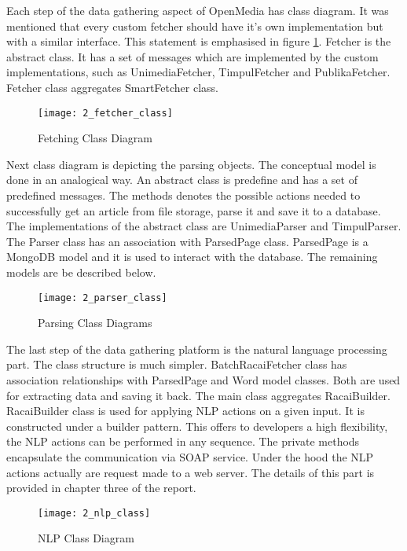 Each step of the data gathering aspect of OpenMedia has class diagram. It was mentioned that every custom fetcher should have it's own implementation but with a similar interface. This statement is emphasised in figure \ref{fetcher_class}. Fetcher is the abstract class. It has a set of messages which are implemented by the custom implementations, such as UnimediaFetcher, TimpulFetcher and PublikaFetcher. Fetcher class aggregates SmartFetcher class.

\begin{figure}[!ht]
\centering
\texttt{[image: 2\_fetcher\_class]}
\caption{Fetching Class Diagram}\label{fetcher_class}
\end{figure}

Next class diagram is depicting the parsing objects. The conceptual model is done in an analogical way. An abstract class is predefine and has a set of predefined messages. The methods denotes the possible actions needed to successfully get an article from file storage, parse it and save it to a database. The implementations of the abstract class are UnimediaParser and TimpulParser. The Parser class has an association with ParsedPage class. ParsedPage is a MongoDB model and it is used to interact with the database. The remaining models are be described below.

\begin{figure}[!ht]
\centering
\texttt{[image: 2\_parser\_class]}
\caption{Parsing Class Diagrams}\label{parser_class}
\end{figure}

The last step of the data gathering platform is the natural language processing part. The class structure is much simpler. BatchRacaiFetcher class has association relationships with ParsedPage and Word model classes. Both are used for extracting data and saving it back. The main class aggregates RacaiBuilder. RacaiBuilder class is used for applying NLP actions on a given input. It is constructed under a builder pattern. This offers to developers a high flexibility, the NLP actions can be performed in any sequence. The private methods encapsulate the communication via SOAP service. Under the hood the NLP actions actually are request made to a web server. The details of this part is provided in chapter three of the report.

\begin{figure}[!ht]
\centering
\texttt{[image: 2\_nlp\_class]}
\caption{NLP Class Diagram}\label{nlp_class}
\end{figure}

